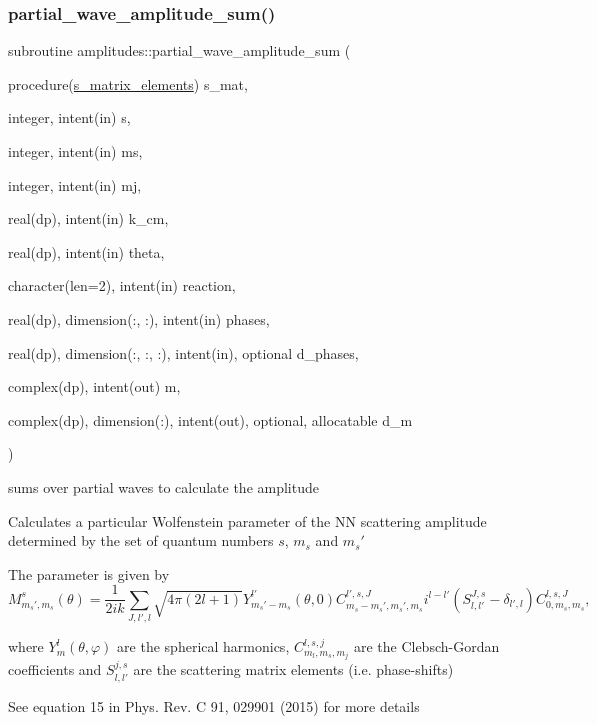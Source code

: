\subsubsection{\texorpdfstring{partial\+\_\+wave\+\_\+amplitude\+\_\+sum()}{partial\_wave\_amplitude\_sum()}}
{\footnotesize\ttfamily subroutine amplitudes\+::partial\+\_\+wave\+\_\+amplitude\+\_\+sum (\begin{DoxyParamCaption}\item[{procedure(\hyperlink{interfaceamplitudes_1_1s__matrix__elements}{s\+\_\+matrix\+\_\+elements})}]{s\+\_\+mat,  }\item[{integer, intent(in)}]{s,  }\item[{integer, intent(in)}]{ms,  }\item[{integer, intent(in)}]{mj,  }\item[{real(dp), intent(in)}]{k\+\_\+cm,  }\item[{real(dp), intent(in)}]{theta,  }\item[{character(len=2), intent(in)}]{reaction,  }\item[{real(dp), dimension(\+:, \+:), intent(in)}]{phases,  }\item[{real(dp), dimension(\+:, \+:, \+:), intent(in), optional}]{d\+\_\+phases,  }\item[{complex(dp), intent(out)}]{m,  }\item[{complex(dp), dimension(\+:), intent(out), optional, allocatable}]{d\+\_\+m }\end{DoxyParamCaption})\hspace{0.3cm}{\ttfamily [private]}}



sums over partial waves to calculate the amplitude 

Calculates a particular Wolfenstein parameter of the NN scattering amplitude determined by the set of quantum numbers $s$, $m_s$ and $m_s'$

The parameter is given by \[M_{m_s',m_s}^s(\theta) = \frac{1}{2ik} \sum_{J,l',l} \sqrt{4\pi(2l+1)} Y_{m_s'-m_s}^{l'}(\theta,0) C_{m_s-m_s',m_s',m_s}^{l',s,J} i^{l-l'} (S_{l,l'}^{J,s}-\delta_{l',l})C_{0,m_s,m_s}^{l,s,J},\]

where $Y_{m}^{l}(\theta,\varphi)$ are the spherical harmonics, $C_{m_l,m_s,m_j}^{l,s,j}$ are the Clebsch-\/\+Gordan coefficients and $S_{l,l'}^{j,s}$ are the scattering matrix elements (i.\+e. phase-\/shifts)

See equation 15 in Phys. Rev. C 91, 029901 (2015) for more details

